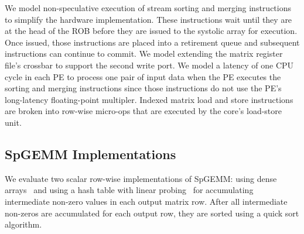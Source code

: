 We model non-speculative execution of stream sorting and merging instructions
to simplify the hardware implementation.
These instructions wait until they are at the head of the ROB
before they are issued to the systolic array for execution. Once issued,
those instructions are placed into a retirement queue
and subsequent instructions can continue to commit. We model extending
the matrix register file's crossbar to support the second write port. We
model a latency of one CPU cycle in each PE to process one pair of input
data when the PE executes the sorting and merging instructions since
those instructions do not use the PE's long-latency floating-point
multipler. Indexed matrix load and store instructions are broken into
row-wise micro-ops that are executed by the core's load-store unit.

\subsection{SpGEMM Implementations}

 We evaluate two scalar row-wise implementations of
SpGEMM:  using dense
arrays~\cite{gilbert-sparse-matlab-1992} and  using a hash
table with linear
probing~\cite{anh-hash-spgemm-2016,deveci-multithreaded-spgemm-2018} for
accumulating intermediate non-zero values in each output matrix row.
After all intermediate non-zeros are accumulated for each output row,
they are sorted using a quick sort algorithm.

